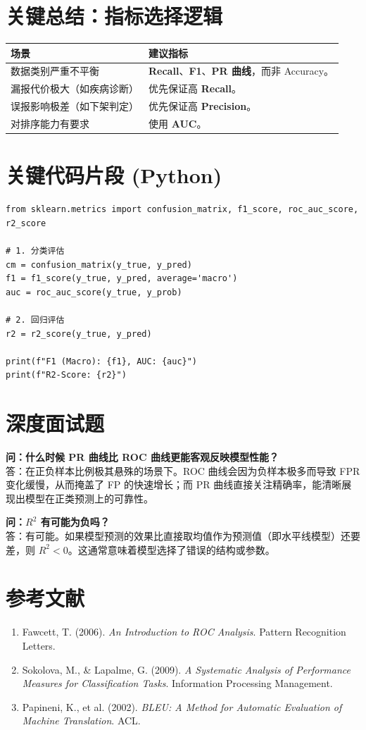 \documentclass[12pt, a4paper]{article}
\begin{document}
\section{关键总结：指标选择逻辑}
\begin{table}[h]
\centering
\begin{tabularx}{\textwidth}{|l|X|}
\hline
\textbf{场景} & \textbf{建议指标} \\
\hline
数据类别严重不平衡 & \textbf{Recall}、\textbf{F1}、\textbf{PR 曲线}，而非 Accuracy。 \\
\hline
漏报代价极大（如疾病诊断） & 优先保证高 \textbf{Recall}。 \\
\hline
误报影响极差（如下架判定） & 优先保证高 \textbf{Precision}。 \\
\hline
对排序能力有要求 & 使用 \textbf{AUC}。 \\
\hline
\end{tabularx}
\end{table}

\section{关键代码片段 (Python)}
\begin{lstlisting}
from sklearn.metrics import confusion_matrix, f1_score, roc_auc_score, r2_score

# 1. 分类评估
cm = confusion_matrix(y_true, y_pred)
f1 = f1_score(y_true, y_pred, average='macro')
auc = roc_auc_score(y_true, y_prob)

# 2. 回归评估
r2 = r2_score(y_true, y_pred)

print(f"F1 (Macro): {f1}, AUC: {auc}")
print(f"R2-Score: {r2}")
\end{lstlisting}

\section{深度面试题}

\textbf{问：什么时候 PR 曲线比 ROC 曲线更能客观反映模型性能？}\\
答：在正负样本比例极其悬殊的场景下。ROC 曲线会因为负样本极多而导致 FPR 变化缓慢，从而掩盖了 FP 的快速增长；而 PR 曲线直接关注精确率，能清晰展现出模型在正类预测上的可靠性。

\textbf{问：$R^2$ 有可能为负吗？}\\
答：有可能。如果模型预测的效果比直接取均值作为预测值（即水平线模型）还要差，则 $R^2 < 0$。这通常意味着模型选择了错误的结构或参数。

\section{参考文献}
\begin{enumerate}
    \item Fawcett, T. (2006). \textit{An Introduction to ROC Analysis}. Pattern Recognition Letters.
    \item Sokolova, M., \& Lapalme, G. (2009). \textit{A Systematic Analysis of Performance Measures for Classification Tasks}. Information Processing Management.
    \item Papineni, K., et al. (2002). \textit{BLEU: A Method for Automatic Evaluation of Machine Translation}. ACL.
\end{enumerate}
\end{document}
